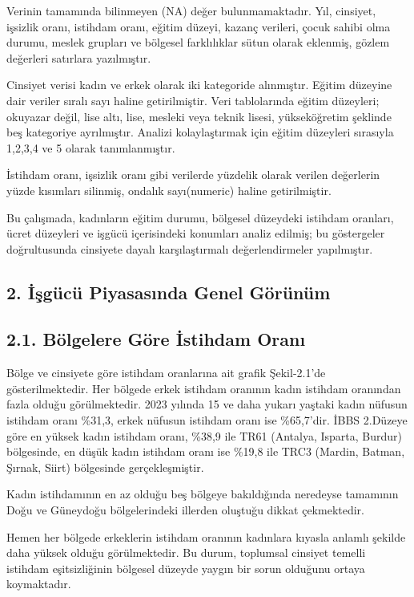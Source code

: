 \documentclass[
  11pt,
  a4paper,
  DIV=11,
  numbers=noendperiod]{scrartcl}
\begin{document}
Verinin tamamında bilinmeyen (NA) değer bulunmamaktadır. Yıl, cinsiyet,
işsizlik oranı, istihdam oranı, eğitim düzeyi, kazanç verileri, çocuk
sahibi olma durumu, meslek grupları ve bölgesel farklılıklar sütun
olarak eklenmiş, gözlem değerleri satırlara yazılmıştır.

Cinsiyet verisi kadın ve erkek olarak iki kategoride alınmıştır. Eğitim
düzeyine dair veriler sıralı sayı haline getirilmiştir. Veri
tablolarında eğitim düzeyleri; okuyazar değil, lise altı, lise, mesleki
veya teknik lisesi, yükseköğretim şeklinde beş kategoriye ayrılmıştır.
Analizi kolaylaştırmak için eğitim düzeyleri sırasıyla 1,2,3,4 ve 5
olarak tanımlanmıştır.

İstihdam oranı, işsizlik oranı gibi verilerde yüzdelik olarak verilen
değerlerin yüzde kısımları silinmiş, ondalık sayı(numeric) haline
getirilmiştir.

Bu çalışmada, kadınların eğitim durumu, bölgesel düzeydeki istihdam
oranları, ücret düzeyleri ve işgücü içerisindeki konumları analiz
edilmiş; bu göstergeler doğrultusunda cinsiyete dayalı karşılaştırmalı
değerlendirmeler yapılmıştır.

\subsection{2. İşgücü Piyasasında Genel
Görünüm}\label{iux15fguxfccuxfc-piyasasux131nda-genel-guxf6ruxfcnuxfcm}

\subsection{2.1. Bölgelere Göre İstihdam
Oranı}\label{buxf6lgelere-guxf6re-istihdam-oranux131}

Bölge ve cinsiyete göre istihdam oranlarına ait grafik Şekil-2.1'de
gösterilmektedir. Her bölgede erkek istihdam oranının kadın istihdam
oranından fazla olduğu görülmektedir. 2023 yılında 15 ve daha yukarı
yaştaki kadın nüfusun istihdam oranı \%31,3, erkek nüfusun istihdam
oranı ise \%65,7'dir. İBBS 2.Düzeye göre en yüksek kadın istihdam oranı,
\%38,9 ile TR61 (Antalya, Isparta, Burdur) bölgesinde, en düşük kadın
istihdam oranı ise \%19,8 ile TRC3 (Mardin, Batman, Şırnak, Siirt)
bölgesinde gerçekleşmiştir.

Kadın istihdamının en az olduğu beş bölgeye bakıldığında neredeyse
tamamının Doğu ve Güneydoğu bölgelerindeki illerden oluştuğu dikkat
çekmektedir.

Hemen her bölgede erkeklerin istihdam oranının kadınlara kıyasla anlamlı
şekilde daha yüksek olduğu görülmektedir. Bu durum, toplumsal cinsiyet
temelli istihdam eşitsizliğinin bölgesel düzeyde yaygın bir sorun
olduğunu ortaya koymaktadır.
\end{document}
